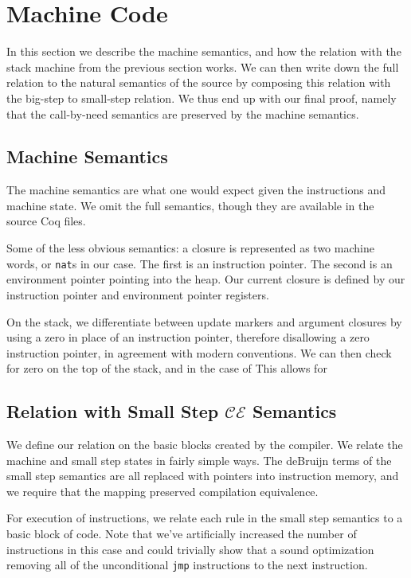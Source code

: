 \section{Machine Code}

In this section we describe the machine semantics, and how the relation with the
stack machine from the previous section works. We can then write down the full
relation to the natural semantics of the source by composing this relation with
the big-step to small-step relation. We thus end up with our final proof, namely
that the call-by-need semantics are preserved by the machine semantics. 

\subsection{Machine Semantics}

The machine semantics are what one would expect given the instructions and
machine state. We omit the full semantics, though they are available in the
source Coq files.

Some of the less obvious semantics: a closure is represented as two machine
words, or \texttt{nat}s in our case. The first is an instruction pointer. The
second is an environment pointer pointing into the heap. Our current closure is
defined by our instruction pointer and environment pointer registers. 

On the stack, we differentiate between update markers and argument closures by
using a zero in place of an instruction pointer, therefore disallowing a zero
instruction pointer, in agreement with modern conventions. We can then check for
zero on the top of the stack, and in the case of This allows for  

\subsection{Relation with Small Step $\mathcal{CE}$ Semantics}

We define our relation on the basic blocks created by the compiler. We relate
the machine and small step states in fairly simple ways. The deBruijn terms of
the small step semantics are all replaced with pointers into instruction memory,
and we require that the mapping preserved compilation equivalence. 

For execution of instructions, we relate each rule in the small step semantics
to a basic block of code. Note that we've artificially increased the number of
instructions in this case and could trivially show that a sound optimization
removing all of the unconditional \texttt{jmp} instructions to the next
instruction. 

